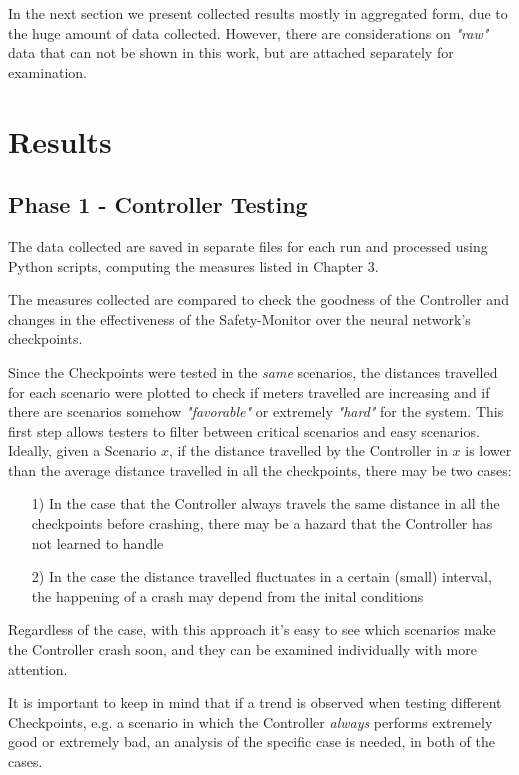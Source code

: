 In the next section we present collected results mostly in aggregated form, due to the huge amount of data collected. However, there are considerations on \textsl{"raw"} data that can not be shown in this work, but are attached separately for examination.

\section{Results}

\subsection{Phase 1 - Controller Testing}

The data collected are saved in separate files for each run and processed using Python scripts, computing the measures listed in Chapter 3.

The measures collected are compared to check the goodness of the Controller and changes in the effectiveness of the Safety-Monitor over the neural network's checkpoints.

Since the Checkpoints were tested in the \textsl{same} scenarios, the distances travelled for each scenario were plotted to check if meters travelled are increasing and if there are scenarios somehow \textsl{"favorable"} or extremely \textsl{"hard"} for the system. This first step allows testers to filter between critical scenarios and easy scenarios. Ideally, given a Scenario $x$, if the distance travelled by the Controller in $x$ is lower than the average distance travelled in all the checkpoints, there may be two cases:

\begin{itemize}
	\item[1)] In the case that the Controller always travels the same distance in all the checkpoints before crashing, there may be a hazard that the Controller has not learned to handle
	\item[2)] In the case the distance travelled fluctuates in a certain (small) interval, the happening of a crash may depend from the inital conditions
\end{itemize}

Regardless of the case, with this approach it's easy to see which scenarios make the Controller crash soon, and they can be examined individually with more attention.

It is important to keep in mind that if a trend is observed when testing different Checkpoints, e.g. a scenario in which the Controller \textsl{always} performs extremely good or extremely bad, an analysis of the specific case is needed, in both of the cases.

